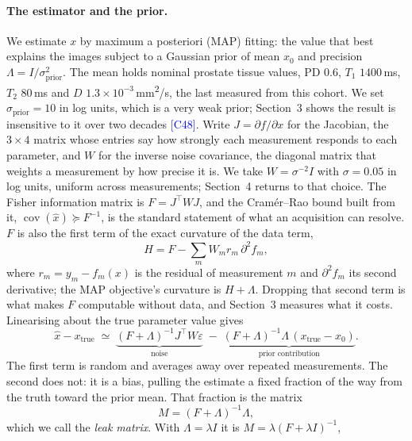 \documentclass{article}
\newcommand{\claim}[1]{\textcolor{blue}{\footnotesize[#1]}}
\newcommand{\claim}[1]{\unskip}
\begin{document}
\paragraph{The estimator and the prior.} We estimate $x$ by maximum a posteriori (MAP) fitting:
the value that best explains the images subject to a Gaussian prior of mean $x_0$ and precision
$\Lambda = I / \sigma_{\text{prior}}^2$. The mean holds nominal prostate tissue values, PD $0.6$,
$T_1$ $1400$\,ms, $T_2$ $80$\,ms and $D$ $1.3\times10^{-3}$\,mm\textsuperscript{2}/s, the last
measured from this cohort. We set $\sigma_{\text{prior}} = 10$ in log units, which is a very weak
prior; Section~3 shows the result is insensitive to it over two decades \claim{C48}. Write $J = \partial f/\partial x$
for the Jacobian, the $3 \times 4$ matrix whose entries say how strongly each measurement responds
to each parameter, and $W$ for the inverse noise covariance, the diagonal matrix that weights a measurement by how
precise it is. We take $W = \sigma^{-2} I$ with $\sigma = 0.05$ in log units, uniform across
measurements; Section~4 returns to that choice. The Fisher
information matrix is $F = J^{\top} W J$, and the Cram\'er--Rao bound built from it,
$\operatorname{cov}(\hat{x}) \succeq F^{-1}$, is the standard statement of what an acquisition can
resolve. $F$ is also the first term of the exact curvature of the data term,
\begin{equation}
  H = F - \sum_m W_m r_m \, \partial^2 f_m ,
  \label{eq:hessian}
\end{equation}
where $r_m = y_m - f_m(x)$ is the residual of measurement $m$ and $\partial^2 f_m$ its second
derivative; the MAP objective's curvature is $H + \Lambda$. Dropping that second term is what makes $F$ computable without data, and Section~3
measures what it costs. Linearising about the true parameter value gives
\begin{equation}
  \hat{x} - x_{\text{true}} \;\simeq\;
  \underbrace{(F+\Lambda)^{-1}J^{\top}W\varepsilon}_{\text{noise}}
  \;-\; \underbrace{(F+\Lambda)^{-1}\Lambda\,(x_{\text{true}}-x_{0})}_{\text{prior contribution}} .
  \label{eq:decomp}
\end{equation}
The first term is random and averages away over repeated measurements. The second does not: it is
a bias, pulling the estimate a fixed fraction of the way from the truth toward the prior mean. That
fraction is the matrix
\begin{equation*}
  M = (F+\Lambda)^{-1}\Lambda ,
\end{equation*}
which we call the \emph{leak matrix}. With $\Lambda = \lambda I$ it is $M = \lambda(F+\lambda I)^{-1}$,
\end{document}
